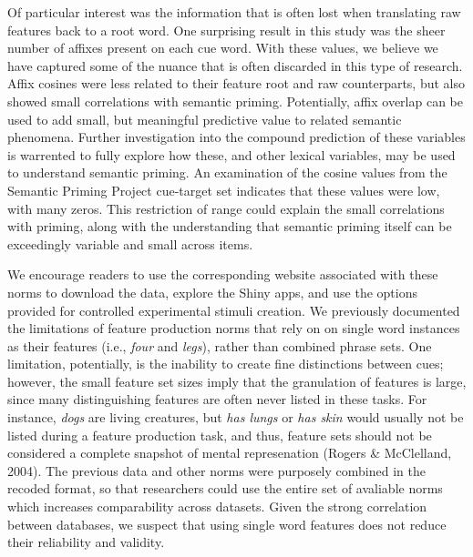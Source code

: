 \documentclass[english,man]{apa6}
\theoremstyle{definition}
\theoremstyle{definition}
\theoremstyle{definition}
\theoremstyle{remark}
\begin{document}
Of particular interest was the information that is often lost when
translating raw features back to a root word. One surprising result in
this study was the sheer number of affixes present on each cue word.
With these values, we believe we have captured some of the nuance that
is often discarded in this type of research. Affix cosines were less
related to their feature root and raw counterparts, but also showed
small correlations with semantic priming. Potentially, affix overlap can
be used to add small, but meaningful predictive value to related
semantic phenomena. Further investigation into the compound prediction
of these variables is warrented to fully explore how these, and other
lexical variables, may be used to understand semantic priming. An
examination of the cosine values from the Semantic Priming Project
cue-target set indicates that these values were low, with many zeros.
This restriction of range could explain the small correlations with
priming, along with the understanding that semantic priming itself can
be exceedingly variable and small across items.

We encourage readers to use the corresponding website associated with
these norms to download the data, explore the Shiny apps, and use the
options provided for controlled experimental stimuli creation. We
previously documented the limitations of feature production norms that
rely on on single word instances as their features (i.e., \emph{four}
and \emph{legs}), rather than combined phrase sets. One limitation,
potentially, is the inability to create fine distinctions between cues;
however, the small feature set sizes imply that the granulation of
features is large, since many distinguishing features are often never
listed in these tasks. For instance, \emph{dogs} are living creatures,
but \emph{has lungs} or \emph{has skin} would usually not be listed
during a feature production task, and thus, feature sets should not be
considered a complete snapshot of mental represenation (Rogers \&
McClelland, 2004). The previous data and other norms were purposely
combined in the recoded format, so that researchers could use the entire
set of avaliable norms which increases comparability across datasets.
Given the strong correlation between databases, we suspect that using
single word features does not reduce their reliability and validity.
\end{document}
